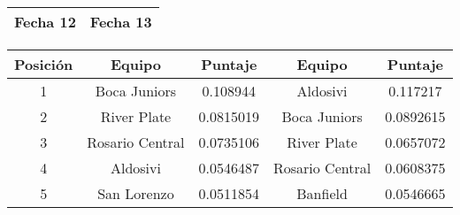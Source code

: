 \begin{table}[H]
	\center
	\hspace{0.105\textwidth}
	\begin{tabular}{| m{} || m{} |}
		\rowcolor{LightCyan}
		\hline Fecha 12 & Fecha 13 \\ \hline
	\end{tabular}
	

	\begin{tabular}{| c | c | c || c | c |}
	  	\hline
	  	\rowcolor{LightCyan}
	  	Posición & Equipo & Puntaje & Equipo & Puntaje \\ \hline \hline
		1 & \cellcolor{blue!20} Boca Juniors & 0.108944 &  \cellcolor{green!20} Aldosivi & 0.117217 \\ \hline
		2 & River Plate & 0.0815019 & \cellcolor{blue!20} Boca Juniors & 0.0892615 \\ \hline
		3 & Rosario Central & 0.0735106 & River Plate & 0.0657072 \\ \hline
		4 & \cellcolor{green!20} Aldosivi & 0.0546487 & Rosario Central & 0.0608375 \\ \hline
		5 & San Lorenzo & 0.0511854 & Banfield & 0.0546665 \\ \hline

\end{tabular}
\end{table}
